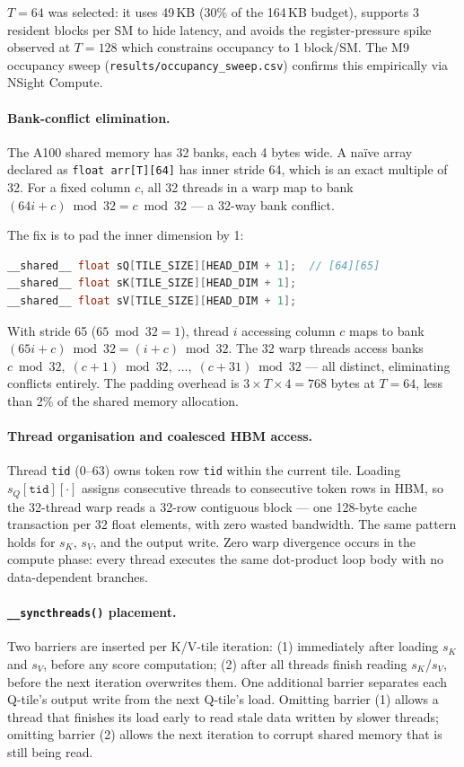 $T = 64$ was selected: it uses 49\,KB (30\% of the 164\,KB budget),
supports 3 resident blocks per SM to hide latency,
and avoids the register-pressure spike observed at $T = 128$
which constrains occupancy to 1 block/SM.
The M9 occupancy sweep (\texttt{results/occupancy\_sweep.csv}) confirms
this empirically via NSight Compute.

\paragraph{Bank-conflict elimination.}
\label{par:bank_conflict}
The A100 shared memory has 32 banks, each 4 bytes wide.
A na\"ive array declared as \texttt{float arr[T][64]} has inner stride 64,
which is an exact multiple of 32.
For a fixed column $c$, all 32 threads in a warp map to bank
$(64i + c) \bmod 32 = c \bmod 32$ --- a 32-way bank conflict.

The fix is to pad the inner dimension by 1:
\begin{lstlisting}[language=C]
__shared__ float sQ[TILE_SIZE][HEAD_DIM + 1];  // [64][65]
__shared__ float sK[TILE_SIZE][HEAD_DIM + 1];
__shared__ float sV[TILE_SIZE][HEAD_DIM + 1];
\end{lstlisting}
With stride 65 ($65 \bmod 32 = 1$), thread $i$ accessing column $c$ maps to
bank $(65i + c) \bmod 32 = (i + c) \bmod 32$.
The 32 warp threads access banks
$c\bmod 32,\; (c{+}1)\bmod 32,\; \ldots,\; (c{+}31)\bmod 32$ ---
all distinct, eliminating conflicts entirely.
The padding overhead is $3 \times T \times 4 = 768$ bytes at $T = 64$,
less than 2\% of the shared memory allocation.

\paragraph{Thread organisation and coalesced HBM access.}
Thread \texttt{tid} (0--63) owns token row \texttt{tid} within the current tile.
Loading $s_Q[\texttt{tid}][\cdot]$ assigns consecutive threads to consecutive
token rows in HBM, so the 32-thread warp reads a 32-row contiguous block
--- one 128-byte cache transaction per 32 float elements,
with zero wasted bandwidth.
The same pattern holds for $s_K$, $s_V$, and the output write.
Zero warp divergence occurs in the compute phase: every thread executes the
same dot-product loop body with no data-dependent branches.

\paragraph{\texttt{\_\_syncthreads()} placement.}
Two barriers are inserted per K/V-tile iteration:
(1) immediately after loading $s_K$ and $s_V$, before any score computation;
(2) after all threads finish reading $s_K$/$s_V$, before the next iteration
    overwrites them.
One additional barrier separates each Q-tile's output write from the next
Q-tile's load.
Omitting barrier (1) allows a thread that finishes its load early to read
stale data written by slower threads; omitting barrier (2) allows the next
iteration to corrupt shared memory that is still being read.

